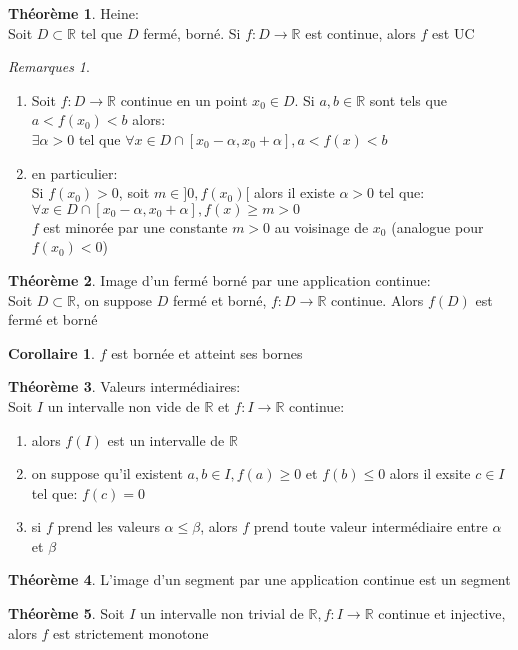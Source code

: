\documentclass[fleqn]{article}
\theoremstyle{definition} \newtheorem*{defi}{D\'efinition}
\theoremstyle{definition} \newtheorem*{theo}{Th\'eor\`eme}
\theoremstyle{definition} \newtheorem*{coro}{Corollaire}
\theoremstyle{remark} \newtheorem*{rqs}{Remarques}
\begin{document}
\begin{theo} Heine: \\
	Soit $D \subset \mathbb{R}$ tel que $D$ ferm\'e, born\'e. Si $f:D \rightarrow \mathbb{R}$ est continue, alors $f$ est UC
\end{theo}
\begin{rqs} $ $
	\begin{enumerate}
		\item Soit $f: D \rightarrow \mathbb{R}$ continue en un point $x_0 \in D$. Si $a, b \in \mathbb{R}$ sont tels que $a < f(x_0) < b$
			alors: \\
			$ \exists \alpha > 0$ tel que $\forall x \in D \cap [x_0 - \alpha, x_0 + \alpha], a < f(x) < b$
		\item en particulier: \\
			Si $f(x_0) > 0$, soit $m \in ]0, f(x_0)[$ alors il existe $\alpha >0$ tel que:
			$\forall x \in D \cap [x_0 - \alpha, x_0 + \alpha], f(x) \geq m > 0$ \\
			$f$ est minor\'ee par une constante $m>0$ au voisinage de $x_0$ (analogue pour $f(x_0) < 0$)
	\end{enumerate}
\end{rqs}

\begin{theo}
	Image d'un ferm\'e born\'e par une application continue: \\
	Soit $D \subset \mathbb{R}$, on suppose $D$ ferm\'e et born\'e, $f:D \rightarrow \mathbb{R}$ continue. Alors $f(D)$ est ferm\'e et born\'e
	\begin{coro}
		$f$ est born\'ee et atteint ses bornes
	\end{coro}
\end{theo}
\begin{theo}
	Valeurs interm\'ediaires: \\
	Soit $I$ un intervalle non vide de $\mathbb{R}$ et $f:I \rightarrow \mathbb{R}$ continue:
	\begin{enumerate}
		\item alors $f(I)$ est un intervalle de $\mathbb{R}$
		\item on suppose qu'il existent $a,b \in I, f(a) \geq 0$ et $f(b) \leq 0$ alors il exsite $c \in I$ tel que: $f(c) = 0$
		\item si $f$ prend les valeurs $\alpha \leq \beta$, alors $f$ prend toute valeur interm\'ediaire entre $\alpha$ et $\beta$
	\end{enumerate}
\end{theo}
\begin{theo}
	L'image d'un segment par une application continue est un segment
\end{theo}
\begin{theo}
	Soit $I$ un intervalle non trivial de $\mathbb{R}, f:I \rightarrow \mathbb{R}$ continue et injective, alors $f$ est strictement monotone
\end{theo}
\end{document}
